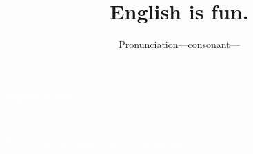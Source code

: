 \documentclass[aspectratio=169,xcolor={dvipsnames,table}]{beamer}
\title{English is fun.}
\subtitle{Pronunciation---consonant---}
\author{}
\institute[]{}
\date[]
\makeatletter
\newcommand*{\themonth}{\two@digits\month}
\newcommand*{\theday}{\two@digits\day}
\newcommand{\mytoday}{{\the\year}--{\themonth}--{\theday}}
\makeatother
\begin{document}
\begin{frame}
\raggedleft
  \textcolor{white}{\Huge\bfseries English is fun.}

\vfill

\raggedleft
 \textcolor{white}{\LARGE\bfseries \mytoday}

\vfill
\vfill
\vfill

\raggedleft
\textcolor{white}{\large The lesson will begin at the scheduled time.}
\end{frame}
\end{document}
